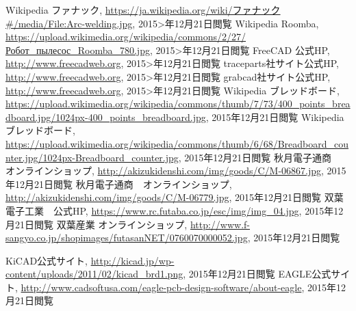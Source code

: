 \begin{thebibliography}{99}
Wikipedia ファナック, \url{https://ja.wikipedia.org/wiki/ファナック#/media/File:Arc-welding.jpg}, 2015>年12月21日閲覧
Wikipedia Roomba, \url{https://upload.wikimedia.org/wikipedia/commons/2/27/Робот_пылесос_Roomba_780.jpg}, 2015>年12月21日閲覧
FreeCAD 公式HP, \url{http://www.freecadweb.org}, 2015>年12月21日閲覧
traceparts社サイト公式HP, \url{http://www.freecadweb.org}, 2015>年12月21日閲覧
grabcad社サイト公式HP, \url{http://www.freecadweb.org}, 2015>年12月21日閲覧
Wikipedia ブレッドボード, \url{https://upload.wikimedia.org/wikipedia/commons/thumb/7/73/400_points_breadboard.jpg/1024px-400_points_breadboard.jpg}, 2015年12月21日閲覧
Wikipedia ブレッドボード, \url{https://upload.wikimedia.org/wikipedia/commons/thumb/6/68/Breadboard_counter.jpg/1024px-Breadboard_counter.jpg}, 2015年12月21日閲覧
秋月電子通商　オンラインショップ, \url{http://akizukidenshi.com/img/goods/C/M-06867.jpg}, 2015年12月21日閲覧
秋月電子通商　オンラインショップ, \url{http://akizukidenshi.com/img/goods/C/M-06779.jpg}, 2015年12月21日閲覧
双葉電子工業　公式HP, \url{https://www.rc.futaba.co.jp/esc/img/img_04.jpg}, 2015年12月21日閲覧
双葉産業 オンラインショップ, \url{http://www.f-sangyo.co.jp/shopimages/futasanNET/0760070000052.jpg}, 2015年12月21日閲覧

KiCAD公式サイト, \url{http://kicad.jp/wp-content/uploads/2011/02/kicad_brd1.png}, 2015年12月21日閲覧
EAGLE公式サイト, \url{http://www.cadsoftusa.com/eagle-pcb-design-software/about-eagle}, 2015年12月21日閲覧

\end{thebibliography}

